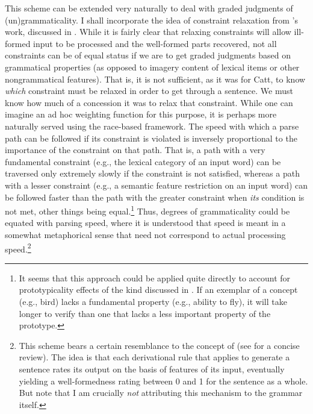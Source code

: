  This scheme can be extended very naturally to deal with graded judgments of (un)grammaticality. I shall incorporate the idea of constraint relaxation from
 's  work, discussed in . While it is fairly clear that relaxing constraints will allow ill-formed input to be processed and the well-formed parts recovered, not all constraints can be of equal status if we are to get graded judgments based on grammatical properties (as opposed to imagery content of lexical items or other nongrammatical features). That is, it is not sufficient, as it was for Catt, to know \textit{which} constraint must be relaxed in order to get through a sentence. We must know how much of a concession it was to relax that constraint. While one can imagine an ad hoc weighting function for this purpose, it is perhaps more naturally served using the race-based framework. The speed with which a parse path can be followed if its constraint is violated is inversely proportional to the importance of the constraint on that path. That is, a path with a very fundamental constraint (e.g., the lexical category of an input word) can be traversed only extremely slowly if the constraint is not satisfied, whereas a path with a lesser constraint (e.g., a semantic feature restriction on an input word) can be followed faster than the path with the greater constraint when \textit{its} condition is not met, other things being equal.\footnote{It seems that this approach could be applied quite directly to account for prototypicality effects of the kind discussed in . If an exemplar of a concept (e.g., bird) lacks a fundamental property (e.g., ability to fly), it will take longer to verify than one that lacks a less important property of the prototype.}
  Thus, degrees of grammaticality could be equated with parsing speed, where it is understood that speed is meant in a somewhat metaphorical sense that need not correspond to actual processing speed.\footnote{This scheme bears a certain resemblance to the concept of  (see \citet{Mohan1977} for a concise review). The idea is that each derivational rule that applies to generate a sentence rates its output on the basis of features of its input, eventually yielding a well-formedness rating between 0 and 1 for the sentence as a whole. But note that I am crucially \textit{not} attributing this mechanism to the grammar itself.}


